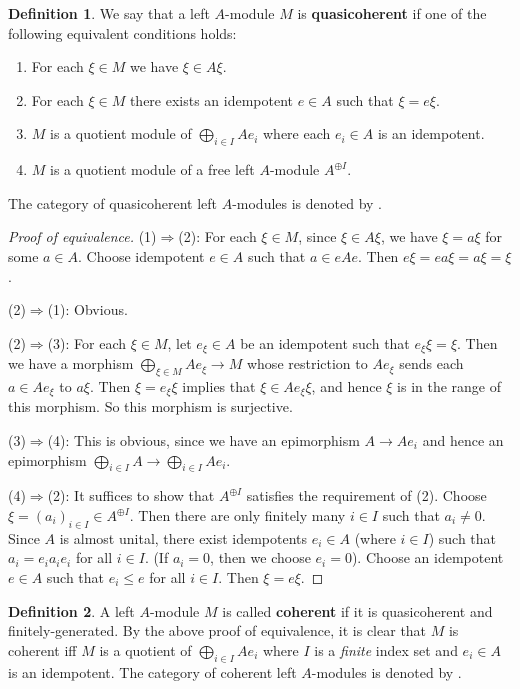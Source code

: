 \documentclass[11pt,b5paper,notitlepage]{article}
\theoremstyle{definition}
\newtheorem{df}{Definition}[section]
\theoremstyle{plain}
\newcommand{\QC}{\mathrm{QCoh}_{\mathrm L}}
\newcommand{\Coh}{\mathrm{Coh}_{\mathrm L}}
\numberwithin{equation}{section}
\begin{document}
\begin{df}\label{lb18}
We say that a left $A$-module $M$ is \textbf{quasicoherent} if one of the following equivalent conditions holds:
\begin{enumerate}[label=(\arabic*)]
\item For each $\xi\in M$ we have $\xi\in A\xi$.
\item For each $\xi\in M$ there exists an idempotent $e\in A$ such that $\xi=e\xi$.
\item $M$ is a quotient module of $\bigoplus_{i\in I}Ae_i$ where each $e_i\in A$ is an idempotent.
\item $M$ is a quotient module of a free left $A$-module $A^{\oplus I}$.
\end{enumerate}
The category of quasicoherent left $A$-modules is denoted by \pmb{$\QC(A)$}.
\end{df}


\begin{proof}[Proof of equivalence]
(1)$\Rightarrow$(2): For each $\xi\in M$, since $\xi\in A\xi$, we have $\xi=a\xi$ for some $a\in A$. Choose idempotent $e\in A$ such that $a\in eAe$. Then $e\xi=ea\xi=a\xi=\xi$.

(2)$\Rightarrow$(1): Obvious.

(2)$\Rightarrow$(3): For each $\xi\in M$, let $e_\xi\in A$ be an idempotent such that $e_\xi\xi=\xi$. Then we have a morphism $\bigoplus_{\xi\in M}Ae_\xi\rightarrow M$ whose restriction to $Ae_\xi$ sends each $a\in Ae_\xi$ to $a\xi$. Then $\xi=e_\xi\xi$ implies that $\xi\in Ae_\xi\xi$, and hence $\xi$ is in the range of this morphism. So this morphism is surjective.

(3)$\Rightarrow$(4): This is obvious, since we have an epimorphism $A\rightarrow Ae_i$ and hence an epimorphism $\bigoplus_{i\in I}A\rightarrow \bigoplus_{i\in I}Ae_i$.

(4)$\Rightarrow$(2): It suffices to show that $A^{\oplus I}$ satisfies the requirement of (2). Choose $\xi=(a_i)_{i\in I}\in A^{\oplus I}$. Then there are only finitely many $i\in I$ such that $a_i\ne 0$. Since $A$ is almost unital, there exist idempotents $e_i\in A$ (where $i\in I$) such that $a_i=e_i a_i e_i$ for all $i\in I$. (If $a_i=0$, then we choose $e_i=0$). Choose an idempotent $e\in A$ such that $e_i\leq e$ for all $i\in I$. Then $\xi=e\xi$.
\end{proof}

\begin{df}\label{lb26}
A left $A$-module $M$ is called \textbf{coherent} if it is quasicoherent and finitely-generated. By the above proof of equivalence, it is clear that $M$ is coherent iff $M$ is a quotient of $\bigoplus_{i\in I}Ae_i$ where $I$ is a \textit{finite} index set and $e_i\in A$ is an idempotent. The category of coherent left $A$-modules is denoted by \pmb{$\Coh(A)$}.
\end{df}
\end{document}
